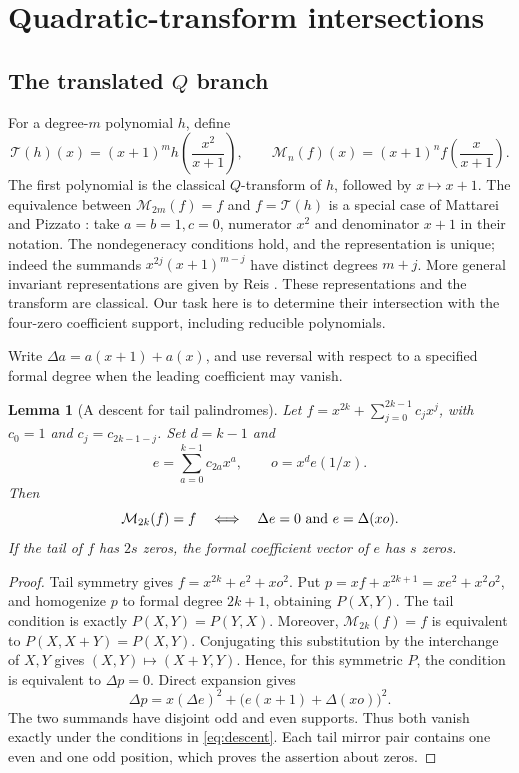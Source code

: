 \documentclass[11pt]{article}
\newtheorem{lemma}[proposition]{Lemma}
\theoremstyle{definition}
\theoremstyle{remark}
\begin{document}
\section{Quadratic-transform intersections}
\label{sec:quadratic}
\subsection{The translated \texorpdfstring{$Q$}{Q} branch}
For a degree-$m$ polynomial $h$, define
\begin{equation}\label{eq:quadratic-transform}
 \mathcal T(h)(x)=(x+1)^m h\!\left(\frac{x^2}{x+1}\right),\qquad
 \mathcal M_n(f)(x)=(x+1)^n f\!\left(\frac{x}{x+1}\right).
\end{equation}
The first polynomial is the classical $Q$-transform of $h$, followed
by $x\mapsto x+1$. The equivalence between
$\mathcal M_{2m}(f)=f$ and $f=\mathcal T(h)$ is a special case of
Mattarei and Pizzato \cite[Lemma 9]{MP17}: take $a=b=1,c=0$,
numerator $x^2$ and denominator $x+1$ in their notation.
The nondegeneracy conditions hold, and the representation is unique;
indeed the summands $x^{2j}(x+1)^{m-j}$ have distinct degrees $m+j$.
More general invariant representations are given by Reis
\cite[Theorem 1.3]{Reis20}. These representations and the transform
are classical. Our task here is to determine their intersection with
the four-zero coefficient support, including reducible polynomials.

Write $\Delta a=a(x+1)+a(x)$, and use reversal with respect to a
specified formal degree when the leading coefficient may vanish.

\begin{lemma}[A descent for tail palindromes]\label{lem:descent}
Let $f=x^{2k}+\sum_{j=0}^{2k-1}c_jx^j$, with $c_0=1$ and
$c_j=c_{2k-1-j}$. Set $d=k-1$ and
\[
 e=\sum_{a=0}^{k-1}c_{2a}x^a,\qquad o=x^d e(1/x).
\]
Then
\begin{equation}\label{eq:descent}
 \mathcal M_{2k}(f)=f
 \quad\Longleftrightarrow\quad
 \Delta e=0\ \hbox{and}\ e=\Delta(xo).
\end{equation}
If the tail of $f$ has $2s$ zeros, the formal coefficient vector of
$e$ has $s$ zeros.
\end{lemma}
\begin{proof}
Tail symmetry gives $f=x^{2k}+e^2+xo^2$. Put
$p=xf+x^{2k+1}=xe^2+x^2o^2$, and homogenize $p$ to formal degree
$2k+1$, obtaining $P(X,Y)$. The tail condition is exactly
$P(X,Y)=P(Y,X)$. Moreover, $\mathcal M_{2k}(f)=f$ is equivalent
to $P(X,X+Y)=P(X,Y)$. Conjugating this substitution by the
interchange of $X,Y$ gives $(X,Y)\mapsto(X+Y,Y)$. Hence, for
this symmetric $P$, the condition is equivalent to $\Delta p=0$.
Direct expansion gives
\[
 \Delta p=x(\Delta e)^2+
 \bigl(e(x+1)+\Delta(xo)\bigr)^2.
\]
The two summands have disjoint odd and even supports. Thus both
vanish exactly under the conditions in \eqref{eq:descent}.
Each tail mirror pair contains one even and one odd position,
which proves the assertion about zeros.
\end{proof}
\end{document}
